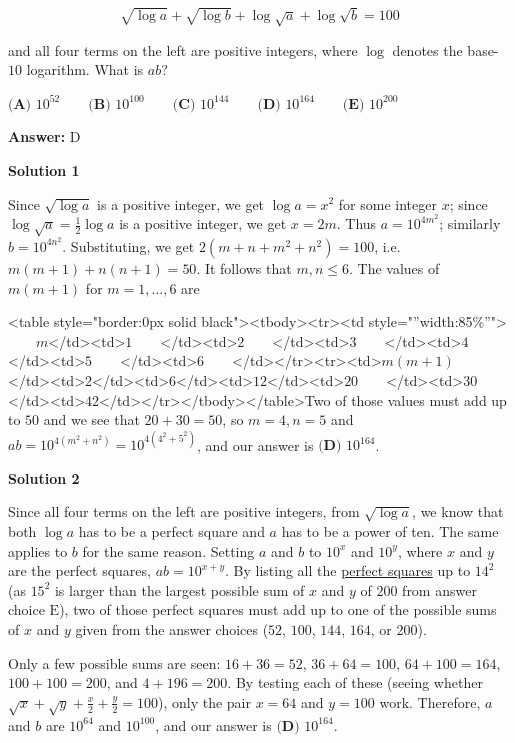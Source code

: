 \begin{enumerate}
 \[\sqrt{\log{a}} + \sqrt{\log{b}} + \log \sqrt{a} + \log \sqrt{b} = 100\]


 and all four terms on the left are positive integers, where $\log$ denotes the base-$10$ logarithm. What is $ab$?


 $\textbf{(A) }   10^{52}   \qquad        \textbf{(B) }   10^{100}   \qquad    \textbf{(C) }   10^{144}   \qquad   \textbf{(D) }  10^{164} \qquad  \textbf{(E) }   10^{200}$

 \textbf{Answer: }D



\textbf{Solution 1}

Since $\sqrt{\log{a}}$ is a positive integer, we get $\log a = x^2$ for some integer $x$; since $\log \sqrt{a} = \frac 12 \log a$ is a positive integer, we get $x=2m$. Thus $a=10^{4m^2}$; similarly $b=10^{4n^2}$. Substituting, we get $2(m+n+m^2+n^2)=100$, i.e. $m(m+1) + n(n+1) = 50$. It follows that $m,n \le 6$. The values of $m(m+1)$ for $m=1,\ldots , 6$ are 

 <table style="border:0px solid black"><tbody><tr><td style="”width:85\%”">$\qquad m$</td><td>$1\qquad$</td><td>$2\qquad$</td><td>$3\qquad$</td><td>$4\qquad$</td><td>$5\qquad$</td><td>$6\qquad$</td></tr><tr><td>$m(m+1)\qquad$</td><td>$2$</td><td>$6$</td><td>$12$</td><td>$20\qquad$</td><td>$30$</td><td>$42$</td></tr></tbody></table>Two of those values must add up to $50$ and we see that $20+30=50$, so $m=4, n=5$ and  $ab=10^{4(m^2+n^2)}=10^{4(4^2+5^2)}$, and our answer is $\boxed{\textbf{(D) } 10^{164}}$.

 



\textbf{Solution 2}

Since all four terms on the left are positive integers, from $\sqrt{\log{a}}$, we know that both $\log{a}$ has to be a perfect square and $a$ has to be a power of ten. The same applies to $b$ for the same reason. Setting $a$ and $b$ to $10^x$ and $10^y$, where $x$ and $y$ are the perfect squares, $ab = 10^{x+y}$. By listing all the \href{https://artofproblemsolving.com/wiki/index.php/Perfect\_square}{perfect squares} up to $14^2$ (as $15^2$ is larger than the largest possible sum of $x$ and $y$ of $200$ from answer choice $\text{E}$), two of those perfect squares must add up to one of the possible sums of $x$ and $y$ given from the answer choices ($52$, $100$, $144$, $164$, or $200$). 

 Only a few possible sums are seen: $16+36=52$, $36+64=100$, $64+100=164$, $100+100=200$, and $4+196=200$. By testing each of these (seeing whether $\sqrt{x} + \sqrt{y} + \frac{x}{2} + \frac{y}{2} = 100$), only the pair $x = 64$ and $y=100$ work. Therefore, $a$ and $b$ are $10^{64}$ and $10^{100}$, and our answer is $\boxed{\textbf{(D) } 10^{164}}$.


\end{enumerate}
